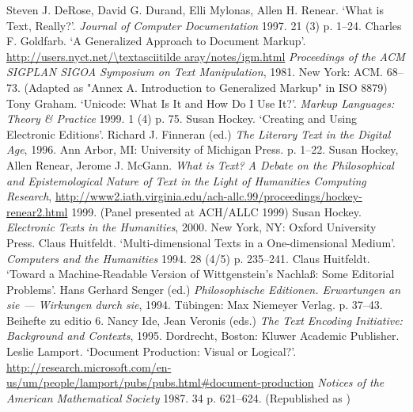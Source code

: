 \begin{bibitemlist}{1}
\label{DeRose1997a}Steven J. DeRose, David G. Durand, Elli Mylonas, Allen H. Renear. ‘What is Text, Really?’.  \textit{Journal of Computer Documentation} 1997. 21  (3)  p. 1–24. 
\label{Goldfarb1981}Charles F. Goldfarb. ‘A Generalized Approach to Document Markup’.  \url{http://users.nyct.net/\textasciitilde aray/notes/igm.html} \textit{Proceedings of the ACM SIGPLAN SIGOA Symposium on Text Manipulation}, 1981. New York: ACM. 68–73.  (Adapted as "Annex A. Introduction to Generalized Markup" in ISO 8879)
\label{Graham1999}Tony Graham. ‘Unicode: What Is It and How Do I Use It?’. \textit{Markup Languages: Theory \& Practice} 1999. 1  (4)  p. 75. 
\label{Hockey1996}Susan Hockey. ‘Creating and Using Electronic Editions’. Richard J. Finneran (ed.) \textit{The Literary Text in the Digital Age}, 1996. Ann Arbor, MI: University of Michigan Press. p. 1–22. 
\label{Hockeyetal1999}Susan Hockey, Allen Renear, Jerome J. McGann. \textit{What is Text? A Debate on the Philosophical and Epistemological Nature of Text in the Light of Humanities Computing Research},  \url{http://www2.iath.virginia.edu/ach-allc.99/proceedings/hockey-renear2.html} 1999.  (Panel presented at ACH/ALLC 1999)
\label{Hockey2000}Susan Hockey. \textit{Electronic Texts in the Humanities}, 2000. New York, NY: Oxford University Press. 
\label{Huitfeldt1994a}Claus Huitfeldt. ‘Multi-dimensional Texts in a One-dimensional Medium’.  \textit{Computers and the Humanities} 1994. 28  (4/5)  p. 235–241. 
\label{Huitfeldt1994b}Claus Huitfeldt. ‘Toward a Machine-Readable Version of Wittgenstein's Nachlaß: Some Editorial Problems’. Hans Gerhard Senger (ed.) \textit{Philosophische Editionen. Erwartungen an sie — Wirkungen durch sie}, 1994. Tübingen: Max Niemeyer Verlag. p. 37–43. Beihefte zu editio  6. 
\label{Ide1995b}Nancy Ide, Jean Veronis (eds.) \textit{The Text Encoding Initiative: Background and Contexts}, 1995. Dordrecht, Boston: Kluwer Academic Publisher. 
\label{Lamport1987}Leslie Lamport. ‘Document Production: Visual or Logical?’.  \url{http://research.microsoft.com/en-us/um/people/lamport/pubs/pubs.html\#document-production} \textit{Notices of the American Mathematical Society} 1987. 34 p. 621–624.  (Republished as \cite{Lamport1988a})

\end{bibitemlist}
